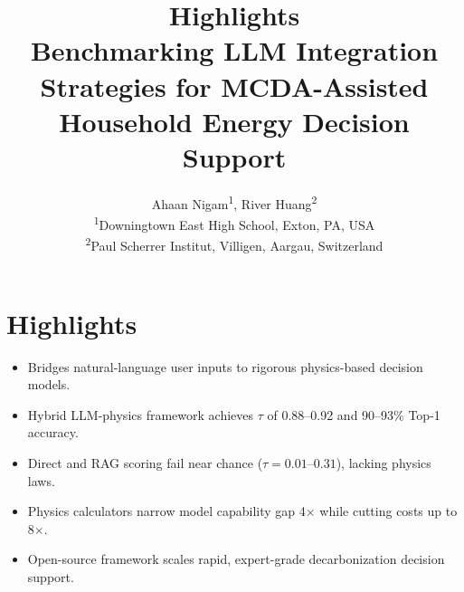 \documentclass[11pt]{article}
\title{Highlights\\[0.5em] \large Benchmarking LLM Integration Strategies for MCDA-Assisted Household Energy Decision Support}
\author{Ahaan Nigam\textsuperscript{1}, River Huang\textsuperscript{2}\\[0.5em]
\small \textsuperscript{1}Downingtown East High School, Exton, PA, USA\\
\small \textsuperscript{2}Paul Scherrer Institut, Villigen, Aargau, Switzerland}
\date{}
\begin{document}
\maketitle

\section*{Highlights}
\begin{itemize}
  \item Bridges natural-language user inputs to rigorous physics-based decision models.
  \item Hybrid LLM-physics framework achieves $\tau$ of 0.88--0.92 and 90--93\% Top-1 accuracy.
  \item Direct and RAG scoring fail near chance ($\tau = 0.01$--$0.31$), lacking physics laws.
  \item Physics calculators narrow model capability gap 4$\times$ while cutting costs up to 8$\times$.
  \item Open-source framework scales rapid, expert-grade decarbonization decision support.
\end{itemize}
\end{document}
